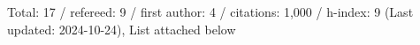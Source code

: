 Total: 17 / refereed: 9 / first author: 4 / citations: 1,000 / h-index: 9 (Last updated: 2024-10-24), List attached below